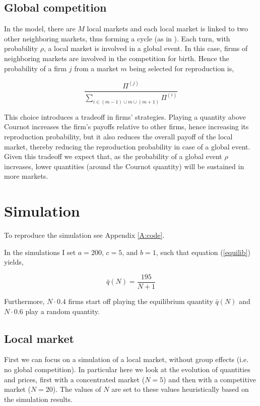 \documentclass[american]{scrartcl}
\begin{document}
\subsection{Global competition}

In the model, there are $M$ local markets and each local market is linked to two other neighboring markets, thus forming a cycle (as in \cite{Akdeniz2020}). Each turn, with probability $\rho$, a local market is involved in a global event. In this case, firms of neighboring markets are involved in the competition for birth. Hence the probability of a firm $j$ from a market $m$ being selected for reproduction is,

\begin{equation}
    \frac{\Pi^{(j)}}{\sum_{i \in (m-1) \cup m \cup (m+1)} \Pi^{(i)}}
\end{equation}

This choice introduces a tradeoff in firms' strategies. Playing a quantity above Cournot increases the firm's payoffs relative to other firms, hence increasing its reproduction probability, but it also reduces the overall payoff of the local market, thereby reducing the reproduction probability in case of a global event. Given this tradeoff we expect that, as the probability of a global event $\rho$ increases, lower quantities (around the Cournot quantity) will be sustained in more markets.

\section{Simulation}

To reproduce the simulation see Appendix \ref{A:code}.

In the simulations I set $a = 200$, $c = 5$, and $b = 1$, such that equation (\ref{equilib}) yields,

\begin{equation}
    \bar{q}(N) = \frac{195}{N+1}
\end{equation}

Furthermore, $N \cdot 0.4$ firms start off playing the equilibrium quantity $\bar{q}(N)$ and $N \cdot 0.6$ play a random quantity.

\subsection{Local market}

First we can focus on a simulation of a local market, without group effects (i.e. no global competition). In particular here we look at the evolution of quantities and prices, first with a concentrated market ($N = 5$) and then with a competitive market ($N = 20$). The values of $N$ are set to these values heuristically based on the simulation results.
\end{document}
